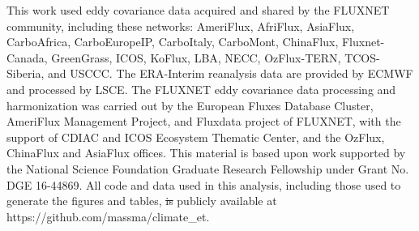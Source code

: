 \documentclass[draft,linenumbers]{agujournal}
\providecommand{\DIFadd}[1]{{\protect\color{blue}\uwave{#1}}} %
\providecommand{\DIFdel}[1]{{\protect\color{red}\sout{#1}}}                      %
\providecommand{\DIFaddbegin}{} %
\providecommand{\DIFaddend}{} %
\providecommand{\DIFdelbegin}{} %
\providecommand{\DIFdelend}{} %
\begin{document}
\acknowledgments This work used eddy covariance data acquired and
shared by the FLUXNET community, including these networks: AmeriFlux,
AfriFlux, AsiaFlux, CarboAfrica, CarboEuropeIP, CarboItaly, CarboMont,
ChinaFlux, Fluxnet-Canada, GreenGrass, ICOS, KoFlux, LBA, NECC,
OzFlux-TERN, TCOS-Siberia, and USCCC. The ERA-Interim reanalysis data
are provided by ECMWF and processed by LSCE. The FLUXNET eddy
covariance data processing and harmonization was carried out by the
European Fluxes Database Cluster, AmeriFlux Management Project, and
Fluxdata project of FLUXNET, with the support of CDIAC and ICOS
Ecosystem Thematic Center, and the OzFlux, ChinaFlux and AsiaFlux
offices. This material is based upon work supported by the National
Science Foundation Graduate Research Fellowship under Grant No. DGE
16-44869. All code and data used in this analysis, including those
used to generate the figures and tables, \DIFdelbegin \DIFdel{is }\DIFdelend \DIFaddbegin \DIFadd{are }\DIFaddend publicly available at
https://github.com/massma/climate\_et.



\end{document}
